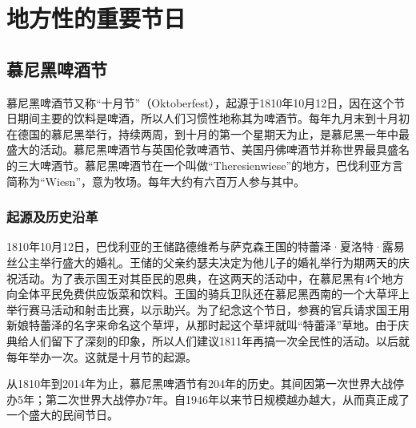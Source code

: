 \section{地方性的重要节日}

\subsection{慕尼黑啤酒节}

慕尼黑啤酒节又称“十月节”（Oktoberfest），起源于1810年10月12日，因在这个节日期间主要的饮料是啤酒，所以人们习惯性地称其为啤酒节。每年九月末到十月初在德国的慕尼黑举行，持续两周，到十月的第一个星期天为止，是慕尼黑一年中最盛大的活动。慕尼黑啤酒节与英国伦敦啤酒节、美国丹佛啤酒节并称世界最具盛名的三大啤酒节。慕尼黑啤酒节在一个叫做“Theresienwiese”的地方，巴伐利亚方言简称为“Wiesn”，意为牧场。每年大约有六百万人参与其中。 

\subsubsection{起源及历史沿革}

1810年10月12日，巴伐利亚的王储路德维希与萨克森王国的特蕾泽·夏洛特·露易丝公主举行盛大的婚礼。王储的父亲约瑟夫决定为他儿子的婚礼举行为期两天的庆祝活动。为了表示国王对其臣民的恩典，在这两天的活动中，在慕尼黑有4个地方向全体平民免费供应饭菜和饮料。王国的骑兵卫队还在慕尼黑西南的一个大草坪上举行赛马活动和射击比赛，以示助兴。为了纪念这个节日，参赛的官兵请求国王用新娘特蕾泽的名字来命名这个草坪，从那时起这个草坪就叫“特蕾泽”草地。由于庆典给人们留下了深刻的印象，所以人们建议1811年再搞一次全民性的活动。以后就每年举办一次。这就是十月节的起源。

从1810年到2014年为止，慕尼黑啤酒节有204年的历史。其间因第一次世界大战停办5年；第二次世界大战停办7年。自1946年以来节日规模越办越大，从而真正成了一个盛大的民间节日。

